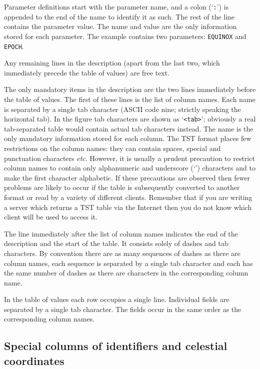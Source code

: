 \documentclass[twoside,11pt]{article}
\renewcommand{\_}{\texttt{\symbol{95}}}
\begin{document}
Parameter definitions start with the parameter name, and a colon (`{\tt :}')
is appended to the end of the name to identify it as such.  The rest of
the line contains the parameter value.  The name and value are the only
information stored for each parameter.  The example contains two
parameters: {\tt EQUINOX} and {\tt EPOCH}.

Any remaining lines in the description (apart from the last two, which
immediately precede the table of values) are free text.

The only mandatory items in the description are the two lines immediately
before the table of values.  The first of these lines is the list of column
names.  Each name is separated by a single tab character (ASCII code nine;
strictly speaking the horizontal tab).  In the figure tab characters are
shown as `{\tt <tab>}'; obviously a real tab-separated table would contain
actual tab characters instead.  The name is the only mandatory information
stored for each column.  The TST format places few restrictions on the
column names: they can contain spaces, special and punctuation characters
\emph{etc}.  However, it is usually a prudent precaution to restrict
column names to contain only alphanumeric and underscore (`{\tt \_}')
characters and to make the first character alphabetic.  If these
precautions are observed then fewer problems are likely to occur if the
table is subsequently converted to another format or read by a variety
of different clients.  Remember that if you are writing a server which
returns a TST table via the Internet then you do not know which client
will be used to access it.

The line immediately after the list of column names indicates the end of
the description and the start of the table.  It consists solely of dashes
and tab characters.  By convention there are as many sequences of dashes
as there are column names, each sequence is separated by a single tab
character and each has the same number of dashes as there are characters
in the corresponding column name.

In the table of values each row occupies a single line.  Individual fields
are separated by a single tab character.  The fields occur in the same
order as the corresponding column names.

\subsection{\label{TSTSPCOL_R}Special columns of identifiers and
celestial coordinates}
\end{document}
